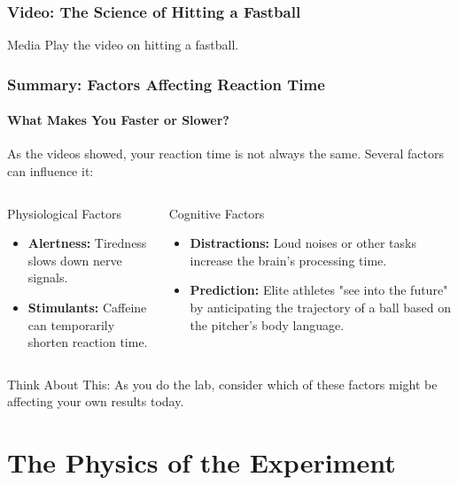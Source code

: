 \documentclass{beamer}
\begin{document}
\begin{frame}
\frametitle{Video: The Science of Hitting a Fastball}
    \vfill
    \begin{alertblock}{Media}
        Play the video on hitting a fastball.
    \end{alertblock}
    \vfill
\end{frame}

\begin{frame}
\frametitle{Summary: Factors Affecting Reaction Time}
\framesubtitle{What Makes You Faster or Slower?}
    As the videos showed, your reaction time is not always the same. Several factors can influence it:
    \begin{columns}[T]
            \begin{block}{Physiological Factors}
                \begin{itemize}
                    \item \textbf{Alertness:} Tiredness slows down nerve signals.
                    \item \textbf{Stimulants:} Caffeine can temporarily shorten reaction time.
                \end{itemize}
            \end{block}
        
            \begin{block}{Cognitive Factors}
                \begin{itemize}
                    \item \textbf{Distractions:} Loud noises or other tasks increase the brain's processing time.
                    \item \textbf{Prediction:} Elite athletes "see into the future" by anticipating the trajectory of a ball based on the pitcher's body language.
                \end{itemize}
            \end{block}
    \end{columns}
    \vfill
    \begin{alertblock}{Think About This:}
    As you do the lab, consider which of these factors might be affecting your own results today.
    \end{alertblock}
\end{frame}

\section{The Physics of the Experiment}
\end{document}
